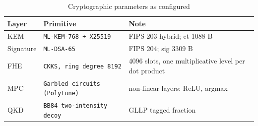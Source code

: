 \begin{table}[htbp]\centering\small
\caption{Cryptographic parameters as configured}
\begin{tabular}{lll}
\toprule
\textbf{Layer} & \textbf{Primitive} & \textbf{Note} \\
\midrule
KEM & \texttt{ML-KEM-768 + X25519} & FIPS 203 hybrid; ct 1088 B \\
Signature & \texttt{ML-DSA-65} & FIPS 204; sig 3309 B \\
FHE & \texttt{CKKS, ring degree 8192} & 4096 slots, one multiplicative level per dot product \\
MPC & \texttt{Garbled circuits (Polytune)} & non-linear layers: ReLU, argmax \\
QKD & \texttt{BB84 two-intensity decoy} & GLLP tagged fraction \\
\bottomrule
\end{tabular}
\end{table}
